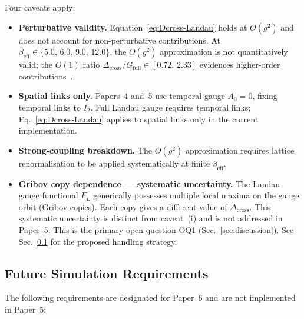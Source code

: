 \documentclass[12pt]{article}
\numberwithin{equation}{section}
\theoremstyle{plain}
\theoremstyle{definition}
\theoremstyle{remark}
\newcommand{\Gfull}{G_{\mathrm{full}}}     %
\newcommand{\Dcross}{\Delta_{\mathrm{cross}}}  %
\begin{document}
	Four caveats apply:
	\begin{itemize}
		\item[(i)]
		\textbf{Perturbative validity.}
		Equation~\eqref{eq:Dcross-Landau} holds at $O(g^{2})$ and does
		not account for non-perturbative contributions.  At
		$\beta_{\mathrm{eff}}\in\{5.0,\,6.0,\,9.0,\,12.0\}$, the
		$O(g^{2})$ approximation is not quantitatively valid; the $O(1)$
		ratio $\Dcross/\Gfull\in[0.72,\,2.33]$ evidences higher-order
		contributions~\cite{FirestoneP4}.
		
		\item[(ii)]
		\textbf{Spatial links only.}
		Papers~4 and~5 use temporal gauge $A_{0}=0$, fixing temporal
		links to $I_{2}$.  Full Landau gauge requires temporal links;
		Eq.~\eqref{eq:Dcross-Landau} applies to spatial links only in
		the current implementation.
		
		\item[(iii)]
		\textbf{Strong-coupling breakdown.}
		The $O(g^{2})$ approximation requires lattice renormalisation
		to be applied systematically at finite $\beta_{\mathrm{eff}}$.
		
		\item[(iv)]
		\textbf{Gribov copy dependence --- systematic uncertainty.}
		The Landau gauge functional $F_{L}$ generically possesses
		multiple local maxima on the gauge orbit (Gribov copies).  Each
		copy gives a different value of $\Dcross$.  This systematic
		uncertainty is distinct from caveat~(i) and is not addressed in
		Paper~5.  This is the primary open question OQ1
		(Sec.~\ref{sec:discussion}).  See Sec.~\ref{sec:future-sim} for
		the proposed handling strategy.
	\end{itemize}
	
	\subsection{Future Simulation Requirements}
	\label{sec:future-sim}
	
	The following requirements are designated for Paper~6 and are not
	implemented in Paper~5:
	
\end{document}
